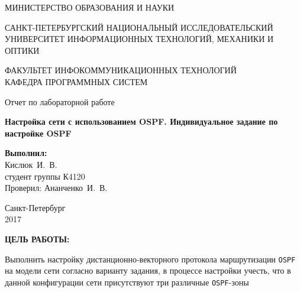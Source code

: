 \documentclass[14pt,a4paper]{extreport}
\newcommand{\header}[1]{%
{
\clearpage%
\fontsize{16pt}{14pt}\selectfont
\begin{center}
\textbf{\MakeUppercase{#1}:}
\end{center}
}
}
\newcommand{\ospf}{\texttt{\MakeUppercase{ospf}}}
\newcommand{\labyear}{2017}
\newcommand{\labtitle}{Настройка сети с использованием OSPF. Индивидуальное задание по настройке OSPF}
\newcommand{\prepod}{Ананченко~И.~В.}
\newcommand{\student}{Кислюк~И.~В.}
\begin{document}
	\begin{titlepage}
	\begin{center}	
		\fontsize{14pt}{14pt}\selectfont
		МИНИСТЕРСТВО ОБРАЗОВАНИЯ И НАУКИ\\

		\vspace*{0.6\baselineskip}

		\MakeUppercase{Санкт-Петербургский Национальный Исследовательский Университет Информационных технологий, механики и оптики}		
		
		\vspace*{0.6\baselineskip}
		\MakeUppercase{Факультет Инфокоммуникационных технологий}\\
		\MakeUppercase{Кафедра программных систем}
	
		\vspace*{7\baselineskip}
		\fontsize{19pt}{18pt}\selectfont
		Отчет по лабораторной работе
		
		\fontsize{20pt}{18pt}\selectfont
		\textbf{\labtitle}\\
		\vspace*{1.15\baselineskip}
		\end{center}
	
	\vspace*{2\baselineskip}
	\begin{flushright}
	\fontsize{14pt}{14pt}\selectfont
	\textbf{Выполнил:}\\
	\student\\
	студент группы К4120\\
	Проверил: \prepod\\
	\end{flushright}
	
	\vspace{\fill}
	\begin{center}
	Санкт-Петербург\\
	\vspace{-1ex}
	\labyear
	\end{center}
	
\end{titlepage}

\fontsize{14pt}{14pt}\selectfont

\header{Цель работы}


Выполнить настройку дистанционно-векторного протокола маршрутизации \ospf{} на модели сети согласно варианту задания, в процессе настройки учесть, что в данной конфигурации сети присутствуют три различные \ospf -зоны
\end{document}
